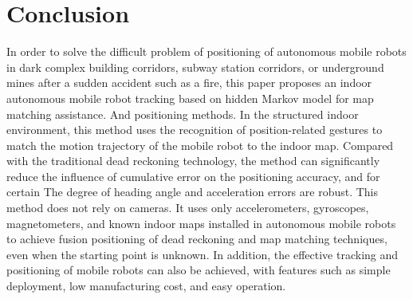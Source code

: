 \documentclass{llncs}
\begin{document}
\section{Conclusion}

In order to solve the difficult problem of positioning of autonomous mobile robots in dark complex building corridors, subway station corridors, or underground mines after a sudden accident such as a fire, this paper proposes an indoor autonomous mobile robot tracking based on hidden Markov model for map matching assistance. And positioning methods. In the structured indoor environment, this method uses the recognition of position-related gestures to match the motion trajectory of the mobile robot to the indoor map. Compared with the traditional dead reckoning technology, the method can significantly reduce the influence of cumulative error on the positioning accuracy, and for certain The degree of heading angle and acceleration errors are robust. This method does not rely on cameras. It uses only accelerometers, gyroscopes, magnetometers, and known indoor maps installed in autonomous mobile robots to achieve fusion positioning of dead reckoning and map matching techniques, even when the starting point is unknown. In addition, the effective tracking and positioning of mobile robots can also be achieved, with features such as simple deployment, low manufacturing cost, and easy operation. 

%
%

%
%
%

\end{document}
